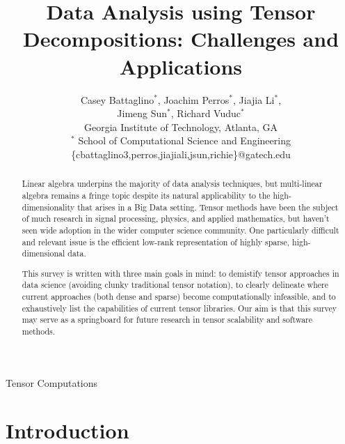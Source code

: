 \documentclass[leqno,onefignum,onetabnum]{siamltex1213}
\title{Data Analysis using Tensor Decompositions: Challenges and Applications}
\author{
  Casey Battaglino$^\ast$, Joachim Perros$^\ast$, Jiajia Li$^\ast$, \\
   Jimeng Sun$^\ast$, Richard Vuduc$^\ast$
  \\ Georgia Institute of Technology, Atlanta, GA
  \\ $^\ast$ School of Computational Science and Engineering \\
  \{cbattaglino3,perros,jiajiali,jsun,richie\}@gatech.edu } \date{}
\begin{document}

\maketitle
{}%

\begin{abstract}
Linear algebra underpins the majority of data analysis techniques, but multi-linear algebra remains a fringe topic despite its natural applicability to the high-dimensionality that arises in a Big Data setting. Tensor methods have been the subject of much research in signal processing, physics, and applied mathematics, but haven't seen wide adoption in the wider computer science community. One particularly difficult and relevant issue is the efficient low-rank representation of highly sparse, high-dimensional data.

This survey is written with three main goals in mind: to demistify tensor approaches in data science (avoiding clunky traditional tensor notation), to clearly delineate where current approaches (both dense and sparse) become computationally infeasible, and to exhaustively list the capabilities of current tensor libraries. Our aim is that this survey may serve as a springboard for future research in tensor scalability and software methods. 
\end{abstract}

\begin{keywords}Tensor Computations\end{keywords}
\begin{AMS}\end{AMS}
\acresetall

\pagestyle{myheadings}
\thispagestyle{plain}

\section{Introduction}              \label{sec:intro}
                                    
\end{document}
